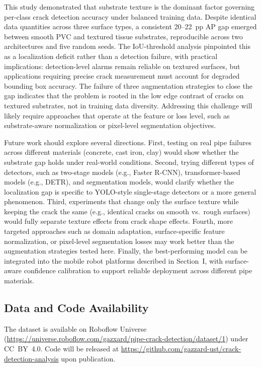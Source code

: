 \documentclass[conference]{IEEEtran}
\begin{document}
This study demonstrated that substrate texture is the dominant factor governing per-class crack detection accuracy under balanced training data. Despite identical data quantities across three surface types, a consistent 20--22~pp AP gap emerged between smooth PVC and textured tissue substrates, reproducible across two architectures and five random seeds. The IoU-threshold analysis pinpointed this as a localization deficit rather than a detection failure, with practical implications: detection-level alarms remain reliable on textured surfaces, but applications requiring precise crack measurement must account for degraded bounding box accuracy. The failure of three augmentation strategies to close the gap indicates that the problem is rooted in the low edge contrast of cracks on textured substrates, not in training data diversity. Addressing this challenge will likely require approaches that operate at the feature or loss level, such as substrate-aware normalization or pixel-level segmentation objectives.

Future work should explore several directions. First, testing on real pipe failures across different materials (concrete, cast iron, clay) would show whether the substrate gap holds under real-world conditions. Second, trying different types of detectors, such as two-stage models (e.g., Faster R-CNN), transformer-based models (e.g., DETR), and segmentation models, would clarify whether the localization gap is specific to YOLO-style single-stage detectors or a more general phenomenon. Third, experiments that change only the surface texture while keeping the crack the same (e.g., identical cracks on smooth vs.\ rough surfaces) would fully separate texture effects from crack shape effects. Fourth, more targeted approaches such as domain adaptation, surface-specific feature normalization, or pixel-level segmentation losses may work better than the augmentation strategies tested here. Finally, the best-performing model can be integrated into the mobile robot platforms described in Section~I, with surface-aware confidence calibration to support reliable deployment across different pipe materials.

\subsection*{Data and Code Availability}
The dataset is available on Roboflow Universe (\url{https://universe.roboflow.com/gazxard/pipe-crack-detection/dataset/1}) under CC~BY~4.0. Code will be released at \url{https://github.com/gazzard-ust/crack-detection-analysis} upon publication.
\end{document}

